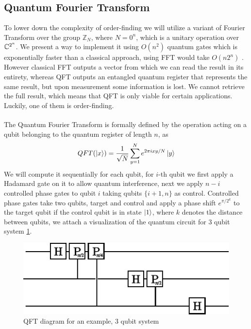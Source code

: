 \subsection{Quantum Fourier Transform}
To lower down the complexity of order-finding we will utilize a variant of Fourier Transform over the group $\mathbb{Z}_N$, where $N=0^n$, which is a unitary operation over $\mathbb{C}^{2^n}$. We present a way to implement it using $O(n^2)$ quantum gates which is exponentially faster than a classical approach, using FFT would take $O(n2^n)$ \cite{cormen2009}. However classical FFT outputs a vector from which we can read the result in its entirety, whereas QFT outputs an entangled quantum register that represents the same result, but upon measurement some information is lost. We cannot retrieve the full result, which means that QFT is only viable for certain applications. Luckily, one of them is order-finding.
\\\\
The Quantum Fourier Transform is formally defined by the operation acting on a qubit belonging to the quantum register of length $n$, as
\begin{align*}
    QFT(\ket{x})=\frac{1}{\sqrt{N}}\sum_{y=1}^{N} e^{2\pi i xy/N}\ket{y}
\end{align*}
We will compute it sequentially for each qubit, for $i$-th qubit we first apply a Hadamard gate on it to allow quantum interference, next we apply $n-i$ controlled phase gates to qubit $i$ taking qubits $\{i+1, n\}$ as control. Controlled phase gates take two qubits, target and control and apply a phase shift $e^{\pi / 2^k}$ to the target qubit if the control qubit is in state $\ket{1}$, where $k$ denotes the distance between qubits, we attach a visualization of the quantum circuit for $3$ qubit system \ref{fig:qft}.
\begin{figure}[ht!]
    \centering
    \includegraphics[width=0.6\linewidth]{figures/qft.pdf}
    \caption{QFT diagram for an example, 3 qubit system}
    \label{fig:qft}
\end{figure}
